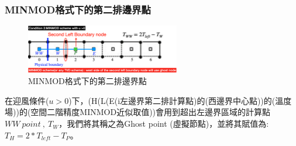 \documentclass[12pt]{article}
\begin{document}
\subsubsection{MINMOD格式下的第二排邊界點}
\begin{figure}[H]
    \centering
    \includegraphics[width=0.6\textwidth]{34.png}
    \caption{\footnotesize MINMOD格式下的第二排邊界點}
    \label{fig:MINMOD格式下的第二排邊界點}
\end{figure}
\noindent 在迎風條件($u>0$)下，(H(L(E(i左邊界第二排計算點)的(西邊界中心點))的(溫度場))的(空間二階精度MINMOD近似取值))會用到超出左邊界區域的計算點$WW\ point\ ,\ T_{W}$，我們將其稱之為Ghost point (虛擬節點)，並將其賦值為:$T_{H} = 2*T_{left} - T_{P}$。
\end{document}
